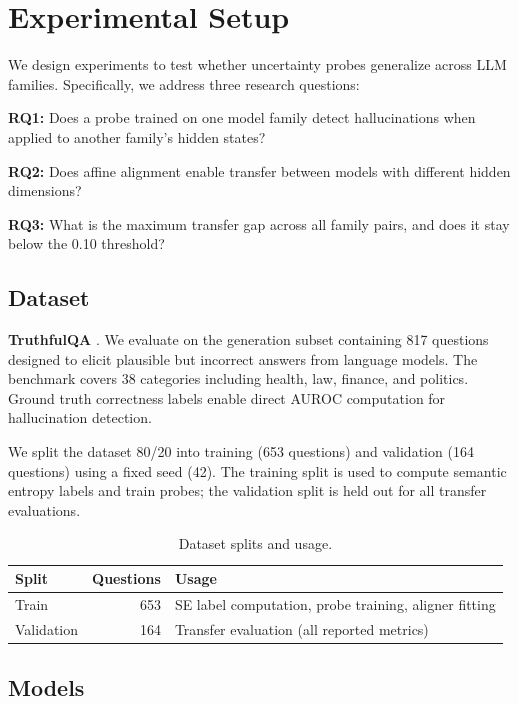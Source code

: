 \section{Experimental Setup}

We design experiments to test whether uncertainty probes generalize across LLM families. Specifically, we address three research questions:

\textbf{RQ1:} Does a probe trained on one model family detect hallucinations when applied to another family's hidden states?

\textbf{RQ2:} Does affine alignment enable transfer between models with different hidden dimensions?

\textbf{RQ3:} What is the maximum transfer gap across all family pairs, and does it stay below the 0.10 threshold?

\subsection{Dataset}

\textbf{TruthfulQA} \citep{lin2022truthfulqa}. We evaluate on the generation subset containing 817 questions designed to elicit plausible but incorrect answers from language models. The benchmark covers 38 categories including health, law, finance, and politics. Ground truth correctness labels enable direct AUROC computation for hallucination detection.

We split the dataset 80/20 into training (653 questions) and validation (164 questions) using a fixed seed (42). The training split is used to compute semantic entropy labels and train probes; the validation split is held out for all transfer evaluations.

\begin{table}[h]
\centering
\caption{Dataset splits and usage.}
\label{tab:splits}
\begin{tabular}{@{}lrl@{}}
\toprule
Split & Questions & Usage \\
\midrule
Train & 653 & SE label computation, probe training, aligner fitting \\
Validation & 164 & Transfer evaluation (all reported metrics) \\
\bottomrule
\end{tabular}
\end{table}

\subsection{Models}


